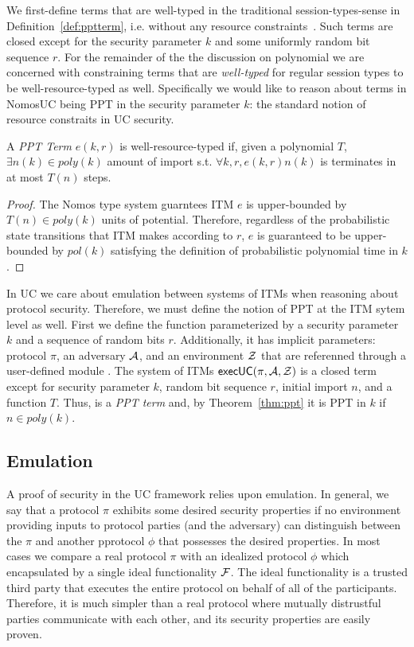 We first-define terms that are well-typed in the traditional session-types-sense in Definition~\ref{def:pptterm}, i.e. without any resource constraints~\cite{sessiontypes}.
Such terms are closed except for the security parameter $k$ and some uniformly random bit sequence $r$. 
For the remainder of the the discussion on polynomial we are concerned with constraining terms that are \textit{well-typed} for regular session types to be well-resource-typed as well.
Specifically we would like to reason about terms in NomosUC being PPT in the security parameter $k$: the standard notion of resource constraits in UC security.

\begin{theorem}[PPT in $k$]\label{thm:ppt}
A \textit{PPT Term} $e(k, r)$ is well-resource-typed if, given a polynomial $T$, $\exists n(k) \in poly(k)$ amount of import s.t. $\forall k, r, e(k, r) {n(k)}$ is terminates in at most $T(n)$ steps.
\end{theorem}

\begin{proof}
The Nomos type system guarntees ITM $e$ is upper-bounded by $T(n) \in poly(k)$ units of potential. 
Therefore, regardless of the probabilistic state transitions that ITM makes according to $r$, $e$ is guaranteed to be upper-bounded by $pol(k)$ satisfying the definition of probabilistic polynomial time in $k$.
\end{proof}

In UC we care about emulation between systems of ITMs when reasoning about protocol security. 
Therefore, we must define the notion of PPT at the ITM sytem level as well.
First we define the  function parameterized by a security parameter $k$ and a sequence of random bits $r$.
Additionally, it has implicit parameters: protocol $\pi$, an adversary $\mathcal{A}$, and an environment $\mathcal{Z}$ that are referenned through a user-defined module .
The system of ITMs ${\mathsf {execUC}}(\pi, \mathcal{A}, \mathcal{Z})$ is a closed term except for security parameter $k$, random bit sequence $r$, initial import $n$, and a function $T$.
Thus,  is a \textit{PPT term} and, by Theorem~\ref{thm:ppt} it is PPT in $k$ if $n \in poly(k)$.


\subsection{Emulation}
A proof of security in the UC framework relies upon emulation.
In general, we say that a protocol $\pi$ exhibits some desired security properties if no environment providing inputs to protocol parties (and the adversary) can distinguish between the $\pi$ and another pprotocol $\phi$ that possesses the desired properties.
In most cases we compare a real protocol $\pi$ with an idealized protocol $\phi$ which encapsulated by a single ideal functionality $\mathcal{F}$.
The ideal functionality is a trusted third party that executes the entire protocol on behalf of all of the participants.
Therefore, it is much simpler than a real protocol where mutually distrustful parties communicate with each other, and its security properties are easily proven.

